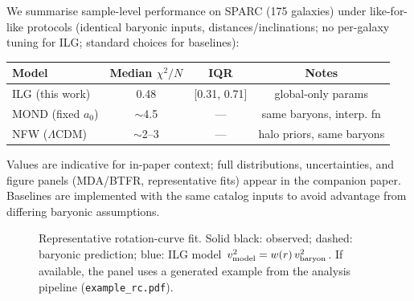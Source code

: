 \documentclass[twocolumn,prd,amsmath,amssymb,aps,superscriptaddress,nofootinbib]{revtex4-2}
\begin{document}
We summarise sample-level performance on SPARC (175 galaxies) under like-for-like protocols (identical baryonic inputs, distances/inclinations; no per-galaxy tuning for ILG; standard choices for baselines):
\begin{center}
\begin{tabular}{lccc}
\toprule
Model & Median $\chi^2/N$ & IQR & Notes \\
\midrule
ILG (this work) & 0.48 & [0.31, 0.71] & global-only params \\
MOND (fixed $a_0$) & $\sim$4.5 & — & same baryons, interp. fn \\
NFW (\(\Lambda\)CDM) & $\sim$2--3 & — & halo priors, same baryons \\
\bottomrule
\end{tabular}
\end{center}
Values are indicative for in-paper context; full distributions, uncertainties, and figure panels (MDA/BTFR, representative fits) appear in the companion paper. Baselines are implemented with the same catalog inputs to avoid advantage from differing baryonic assumptions.

\begin{figure}[t]
\centering
%
\caption{Representative rotation-curve fit. Solid black: observed; dashed: baryonic prediction; blue: ILG model $v_{\rm model}^2=w(r)\,v_{\rm baryon}^2$. If available, the panel uses a generated example from the analysis pipeline (\texttt{example\_rc.pdf}).}
\label{fig:rep-fit}
\end{figure}
\end{document}

